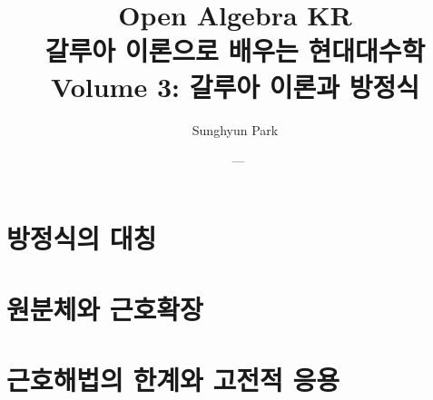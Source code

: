 \documentclass[11pt,openany]{book}
\title{\Huge Open Algebra KR\\[8pt]\Large 갈루아 이론으로 배우는 현대대수학\\[18pt]\large Volume 3: 갈루아 이론과 방정식}
\author{Sunghyun Park}
\date{\BookVersion\ --- \BookRevision}
\theoremstyle{definition}
\theoremstyle{remark}
\begin{document}
\frontmatter
\maketitle


\tableofcontents



\mainmatter
\part{방정식의 대칭}
\setcounter{chapter}{-1}





\part{원분체와 근호확장}




\part{근호해법의 한계와 고전적 응용}



\backmatter




\end{document}
